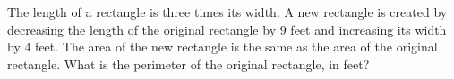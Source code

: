 The length of a rectangle is three times its width. A new rectangle is created by decreasing the length of the original rectangle by $9$ feet and increasing its width by $4$ feet. The area of the new rectangle is the same as the area of the original rectangle. What is the perimeter of the original rectangle, in feet?
